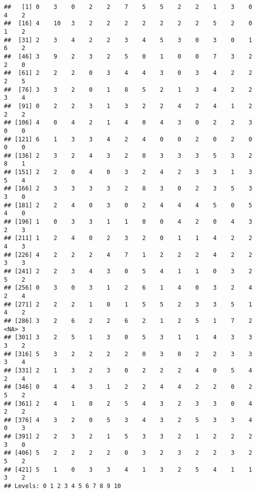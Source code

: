 \documentclass[
]{article}
\begin{document}
\begin{verbatim}
##   [1] 0    3    0    2    2    7    5    5    2    2    1    3    0    4    2   
##  [16] 4    10   3    2    2    2    2    2    2    2    5    2    0    1    2   
##  [31] 2    3    4    2    2    3    4    5    3    0    3    0    1    6    2   
##  [46] 3    9    2    3    2    5    0    1    0    0    7    3    2    2    0   
##  [61] 2    2    2    0    3    4    4    3    0    3    4    2    2    2    5   
##  [76] 3    3    2    0    1    8    5    2    1    3    4    2    2    3    4   
##  [91] 0    2    2    3    1    3    2    2    4    2    4    1    2    2    2   
## [106] 4    0    4    2    1    4    0    4    3    0    2    2    3    0    0   
## [121] 6    1    3    3    4    2    4    0    0    2    0    2    0    0    0   
## [136] 2    3    2    4    3    2    0    3    3    3    5    3    2    8    1   
## [151] 2    2    0    4    0    3    2    4    2    3    3    1    3    5    4   
## [166] 2    3    3    3    3    2    8    3    0    2    3    5    3    3    0   
## [181] 2    2    4    0    3    0    2    4    4    4    5    0    5    4    0   
## [196] 1    0    3    3    1    1    0    0    4    2    0    4    3    2    3   
## [211] 1    2    4    0    2    3    2    0    1    1    4    2    2    4    3   
## [226] 4    2    2    2    4    7    1    2    2    2    4    2    2    3    3   
## [241] 2    2    3    4    3    0    5    4    1    1    0    3    2    5    2   
## [256] 0    3    0    3    1    2    6    1    4    0    3    2    4    2    4   
## [271] 2    2    2    1    0    1    5    5    2    3    3    5    1    4    2   
## [286] 3    2    6    2    2    6    2    1    2    5    1    7    2    <NA> 3   
## [301] 3    2    5    1    3    0    5    3    1    1    4    3    3    3    2   
## [316] 5    3    2    2    2    2    0    3    0    2    2    3    3    3    4   
## [331] 2    1    3    2    3    0    2    2    2    4    0    5    4    2    4   
## [346] 0    4    4    3    1    2    2    4    4    2    2    0    2    5    2   
## [361] 2    4    1    0    2    5    4    3    2    3    3    0    4    2    2   
## [376] 4    3    2    0    5    3    4    3    2    5    3    3    4    0    3   
## [391] 2    2    3    2    1    5    3    3    2    1    2    2    2    3    0   
## [406] 5    2    2    2    2    0    3    2    3    2    2    3    2    5    2   
## [421] 5    1    0    3    3    4    1    3    2    5    4    1    1    3    2   
## Levels: 0 1 2 3 4 5 6 7 8 9 10
\end{verbatim}
\end{document}
